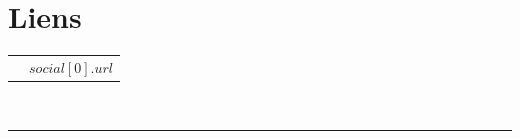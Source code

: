 \documentclass[oneside]{article}
\begin{document}
        \section*{\large Liens}
        \begin{tabular}{cl}
            \faGithub{}   & \href{${social[0].url}$}{${social[0].url}$} \\
        \end{tabular}
        \vspace{10pt} \\
        \rule{\linewidth}{0.4pt} \\
\end{document}
